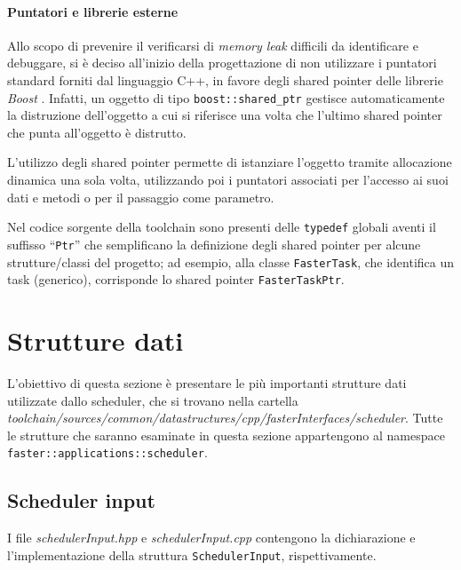 \paragraph{Puntatori e librerie esterne}
Allo scopo di prevenire il verificarsi di \emph{memory leak} difficili da 
identificare e debuggare, si è deciso all'inizio della progettazione di non 
utilizzare i puntatori standard forniti dal linguaggio C++, in favore degli 
shared pointer delle librerie \emph{Boost} \cite{BoostLibrary, BoostSharedPtr}.
Infatti, un oggetto di tipo \verb+boost::shared_ptr+ gestisce automaticamente 
la distruzione dell'oggetto a cui si riferisce una volta che l'ultimo shared 
pointer che punta all'oggetto è distrutto.

L'utilizzo degli shared pointer permette di istanziare l'oggetto tramite 
allocazione dinamica una sola volta, utilizzando poi i puntatori associati per 
l'accesso ai suoi dati e metodi o per il passaggio come parametro.

Nel codice sorgente della toolchain sono presenti delle \verb+typedef+ globali 
aventi il suffisso ``\verb+Ptr+'' che semplificano la definizione degli shared 
pointer per alcune strutture/classi del progetto; ad esempio, alla classe 
\verb+FasterTask+, che identifica un task (generico), corrisponde lo shared 
pointer \verb+FasterTaskPtr+. 


\section{Strutture dati}
\label{sec:struttureDati}
L'obiettivo di questa sezione è presentare le più importanti strutture dati 
utilizzate dallo scheduler, che si trovano nella cartella 
\emph{toolchain/sources/common/datastructures/cpp/fasterInterfaces/scheduler}. 
Tutte le strutture che saranno esaminate in questa sezione appartengono al 
namespace \verb+faster::applications::scheduler+.

\subsection{Scheduler input}
I file \emph{schedulerInput.hpp} e \emph{schedulerInput.cpp} contengono la 
dichiarazione e l'implementazione della struttura \verb+SchedulerInput+, 
rispettivamente.


